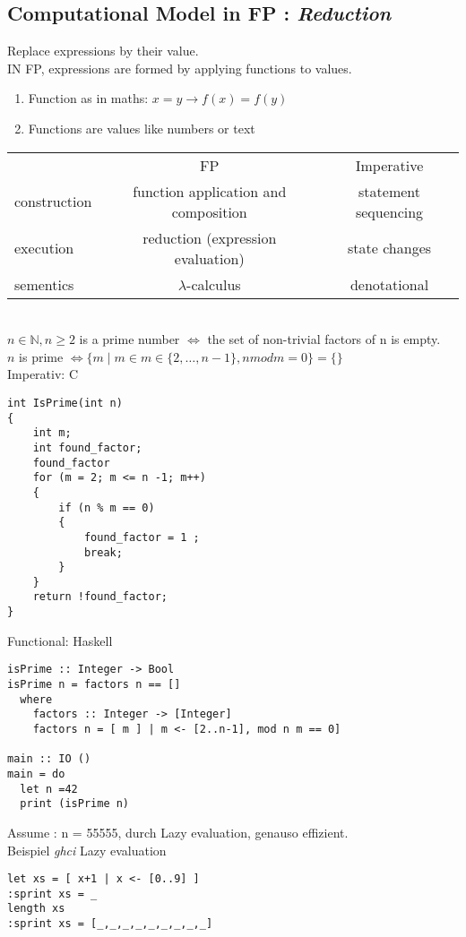 \documentclass{article}
\begin{document}
\subsection{Computational Model in FP : \emph{Reduction}}
Replace expressions by their value.\\
IN FP, expressions are formed by applying functions to values.
\begin{enumerate}
\item Function as in maths: $x = y \rightarrow f(x) = f(y)$
\item Functions are values like numbers or text
\end{enumerate}
\begin{tabular}{l|c|c}
&FP&Imperative\\
construction & function application and composition & statement sequencing\\
execution & reduction (expression evaluation) & state changes\\
sementics & $\lambda$-calculus&denotational
\end{tabular}\bigskip\\
$ n \in \mathbb{N}, n \geq 2$ is a prime number $\Leftrightarrow$ the set of non-trivial factors of n is empty.\\
$n$ is prime $\Leftrightarrow \{ m \mid m \in m \in \{2,\ldots,n-1\}, n mod m = 0 \} = \{\}$\\
Imperativ: C
\begin{verbatim}
int IsPrime(int n)
{
    int m;
    int found_factor;
    found_factor
    for (m = 2; m <= n -1; m++)
    {
        if (n % m == 0)
        {
            found_factor = 1 ;
            break;
        }
    }
    return !found_factor;
}
\end{verbatim}
Functional: Haskell
\begin{verbatim}
isPrime :: Integer -> Bool
isPrime n = factors n == []
  where 
    factors :: Integer -> [Integer]
    factors n = [ m ] | m <- [2..n-1], mod n m == 0]

main :: IO ()
main = do
  let n =42
  print (isPrime n)
\end{verbatim}
Assume : n = 55555, durch Lazy evaluation, genauso effizient.\\
Beispiel \emph{ghci} Lazy evaluation
\begin{verbatim}
let xs = [ x+1 | x <- [0..9] ]
:sprint xs = _
length xs
:sprint xs = [_,_,_,_,_,_,_,_,_]
\end{verbatim}
\end{document}
